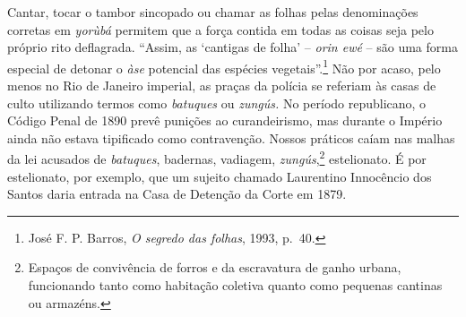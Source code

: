 Cantar, tocar o tambor sincopado ou chamar as folhas pelas denominações
corretas em \emph{yorùbá} permitem que a força contida em todas as
coisas seja pelo próprio rito deflagrada. ``Assim, as `cantigas de
folha' -- \emph{orin ewé} -- são uma forma especial de detonar o
\emph{àse} potencial das espécies vegetais''.\footnote{José F. P.
  Barros, \emph{O segredo das folhas}, 1993, p.~40.} Não por acaso, pelo
menos no Rio de Janeiro imperial, as praças da polícia se referiam às
casas de culto utilizando termos como \emph{batuques} ou \emph{zungús.}
No período republicano, o Código Penal de 1890 prevê punições ao
curandeirismo, mas durante o Império ainda não estava tipificado como
contravenção. Nossos práticos caíam nas malhas da lei acusados de
\emph{batuques}, badernas, vadiagem, \emph{zungús},\footnote{Espaços de
  convivência de forros e da escravatura de ganho urbana, funcionando
  tanto como habitação coletiva quanto como pequenas cantinas ou
  armazéns.} estelionato. É por estelionato, por exemplo, que um sujeito
chamado Laurentino Innocêncio dos Santos daria entrada na Casa de
Detenção da Corte em 1879.

